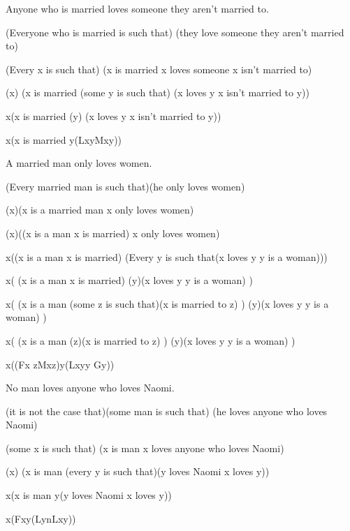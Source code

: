 \begin{argument}
\item[\textbf{(6)}] Anyone who is married loves someone they aren't married to.
\item[$\simeq$] (Everyone who is married is such that)
  (they love someone they aren't married to)
\item[$\simeq$] (Every x is such that)
  (x is married \eif x loves someone x isn't married to)
\item[$\simeq$] (\eforall x)
  (x is married \eif (some y is such that)
  (x loves y \eand x isn't married to y))
\item[$\simeq$] \eforall x(x is married \eif (\eexists y)
  (x loves y \eand x isn't married to y))
\item[$\simeq$] \eforall x(x is married \eif\eexists y(Lxy\eand\enot Mxy))
\end{argument}

\begin{argument}
\item[\textbf{(7)}] A married man only loves women.
\item[$\simeq$] (Every married man is such that)(he only loves women)
\item[$\simeq$] (\eforall x)(x is a married man \eif x only loves women)
\item[$\simeq$] (\eforall x)((x is a man \eand x is married) \eif
  x only loves women)
\item[$\simeq$] \eforall x((x is a man \eand x is married) \eif
  (Every y is such that(x loves y \eif y is a woman)))
\item[$\simeq$] \eforall x( (x is a man \eand x is married) \eif
  (\eforall y)(x loves y \eif y is a woman) )
\item[$\simeq$] \eforall x( (x is a man \eand
  (some z is such that)(x is married to z) ) \eif
  (\eforall y)(x loves y \eif y is a woman) )
\item[$\simeq$] \eforall x( (x is a man \eand
  (\eexists z)(x is married to z) ) \eif
  (\eforall y)(x loves y \eif y is a woman) )
\item[$\simeq$] \eforall x((Fx \eand\eexists zMxz)\eif\eforall y(Lxy\eif y Gy))
\end{argument}

\begin{argument}
\item[\textbf{(8)}] No man loves anyone who loves Naomi.
\item[$\simeq$] (it is not the case that)(some man is such that)
  (he loves anyone who loves Naomi)
\item[$\simeq$] \enot(some x is such that)
  (x is man \eand x loves anyone who loves Naomi)
\item[$\simeq$] \enot(\eexists x)
  (x is man \eand (every y is such that)(y loves Naomi \eif x loves y))
\item[$\simeq$] \enot\eexists x(x is man \eand
  \eforall y(y loves Naomi \eif x loves y))
\item[$\simeq$] \enot\eexists x(Fx\eand\eforall y(Lyn\eif Lxy))
\end{argument}

